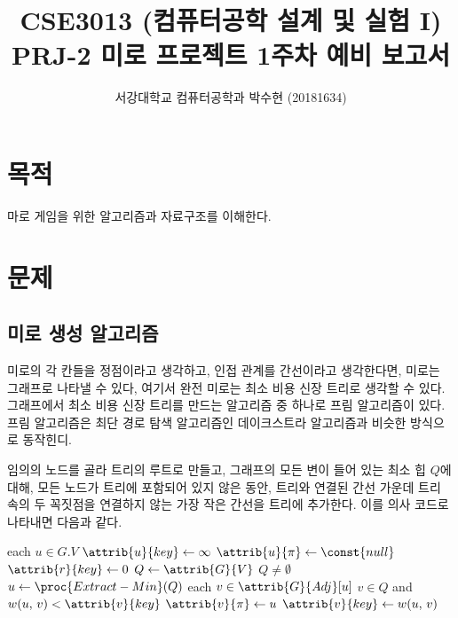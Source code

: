 
	


\title{CSE3013 (컴퓨터공학 설계 및 실험 I) \space \newline PRJ-2 미로 프로젝트 1주차 예비 보고서}
\author{서강대학교 컴퓨터공학과 박수현 (20181634)}
\maketitle

\section{목적}
마로 게임을 위한 알고리즘과 자료구조를 이해한다.

\section{문제}
\subsection{미로 생성 알고리즘}

미로의 각 칸들을 정점이라고 생각하고, 인접 관계를 간선이라고 생각한다면, 미로는 그래프로 나타낼 수 있다, 여기서 완전 미로는
최소 비용 신장 트리로 생각할 수 있다. 그래프에서 최소 비용 신장 트리를 만드는
알고리즘 중 하나로 프림 알고리즘이 있다.
프림 알고리즘은 최단 경로 탐색 알고리즘인 데이크스트라 알고리즘과 비슷한
방식으로 동작힌디.

임의의 노드를 골라 트리의 루트로 만들고, 그래프의 모든 변이 들어 있는 최소 힙 $Q$에 대해,
모든 노드가 트리에 포함되어 있지 않은 동안, 트리와 연결된 간선 가운데 트리 속의 두 꼭짓점을 연결하지 않는 가장 작은 간선을 트리에 추가한다.
이를 의사 코드로 나타내면 다음과 같다.

\begin{codebox}
\li \For each $u \in G.V$ \Do
\li     $\attrib{u}{key} \gets \infty$
\li     $\attrib{u}{\pi} \gets \const{null}$
    \End
\li $\attrib{r}{key} \gets 0$
\li $Q \gets \attrib{G}{V}$
\li \While $Q \neq \emptyset$ \Do
\li     $u \gets \proc{Extract-Min}(Q)$
\li     \For each $v \in \attrib{G}{Adj}[u]$ \Do
\li         \If $v \in Q$ and $w(u,\,v) < \attrib{v}{key}$ \Then
\li             $\attrib{v}{\pi} \gets u$
\li             $\attrib{v}{key} \gets w(u,\,v)$
            \End
        \End
    \End
\end{codebox}

